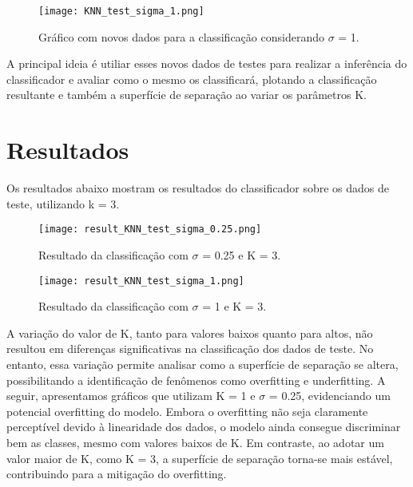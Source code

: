 \documentclass{article} %
\begin{document}
\vspace{1cm}

\begin{figure}[h] %
    \centering %
    \texttt{[image: KNN\_test\_sigma\_1.png]} %
    \caption{Gráfico com novos dados para a classificação considerando $\sigma$ = 1.} %
    \label{fig:exemplo} %
\end{figure}

\vspace{1cm}

A principal ideia é utiliar esses novos dados de testes para realizar a inferência do classificador e avaliar como o mesmo os classificará, plotando a classificação resultante e também a superfície de separação ao variar os parâmetros K.

\section{Resultados}

Os resultados abaixo mostram os resultados do classificador sobre os dados de teste, utilizando k = 3.

\vspace{1cm}

\begin{figure}[h] %
    \centering %
    \texttt{[image: result\_KNN\_test\_sigma\_0.25.png]} %
    \caption{Resultado da classificação com $\sigma$ = 0.25 e K = 3.} %
    \label{fig:exemplo} %
\end{figure}

\begin{figure}[h] %
    \centering %
    \texttt{[image: result\_KNN\_test\_sigma\_1.png]} %
    \caption{Resultado da classificação com $\sigma$ = 1 e K = 3.} %
    \label{fig:exemplo} %
\end{figure}

A variação do valor de K, tanto para valores baixos quanto para altos, não resultou em diferenças significativas na classificação dos dados de teste. No entanto, essa variação permite analisar como a superfície de separação se altera, possibilitando a identificação de fenômenos como overfitting e underfitting. A seguir, apresentamos gráficos que utilizam K = 1 e $\sigma$ = 0.25, evidenciando um potencial overfitting do modelo. Embora o overfitting não seja claramente perceptível devido à linearidade dos dados, o modelo ainda consegue discriminar bem as classes, mesmo com valores baixos de K. Em contraste, ao adotar um valor maior de K, como K = 3, a superfície de separação torna-se mais estável, contribuindo para a mitigação do overfitting.
\end{document}
